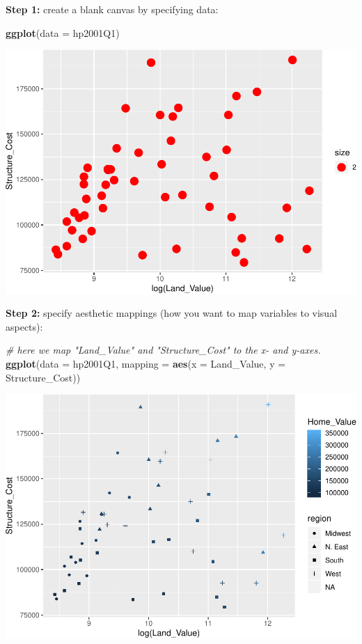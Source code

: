 \documentclass[
]{book}
\newenvironment{Shaded}{\begin{snugshade}}{\end{snugshade}}
\newcommand{\CommentTok}[1]{\textcolor[rgb]{0.56,0.35,0.01}{\textit{#1}}}
\newcommand{\DataTypeTok}[1]{\textcolor[rgb]{0.13,0.29,0.53}{#1}}
\newcommand{\KeywordTok}[1]{\textcolor[rgb]{0.13,0.29,0.53}{\textbf{#1}}}
\newcommand{\NormalTok}[1]{#1}
\begin{document}
\textbf{Step 1:} create a blank canvas by specifying data:

\begin{Shaded}
\begin{Highlighting}[]
\KeywordTok{ggplot}\NormalTok{(}\DataTypeTok{data =}\NormalTok{ hp2001Q1)}
\end{Highlighting}
\end{Shaded}

\includegraphics{R/Rgraphics/figures/unnamed-chunk-154-1.pdf}

\textbf{Step 2:} specify aesthetic mappings (how you want to map variables to visual aspects):

\begin{Shaded}
\begin{Highlighting}[]
\CommentTok{\# here we map "Land\_Value" and "Structure\_Cost" to the x{-} and y{-}axes.}
\KeywordTok{ggplot}\NormalTok{(}\DataTypeTok{data =}\NormalTok{ hp2001Q1, }\DataTypeTok{mapping =} \KeywordTok{aes}\NormalTok{(}\DataTypeTok{x =}\NormalTok{ Land\_Value, }\DataTypeTok{y =}\NormalTok{ Structure\_Cost))}
\end{Highlighting}
\end{Shaded}

\includegraphics{R/Rgraphics/figures/unnamed-chunk-155-1.pdf}
\end{document}
